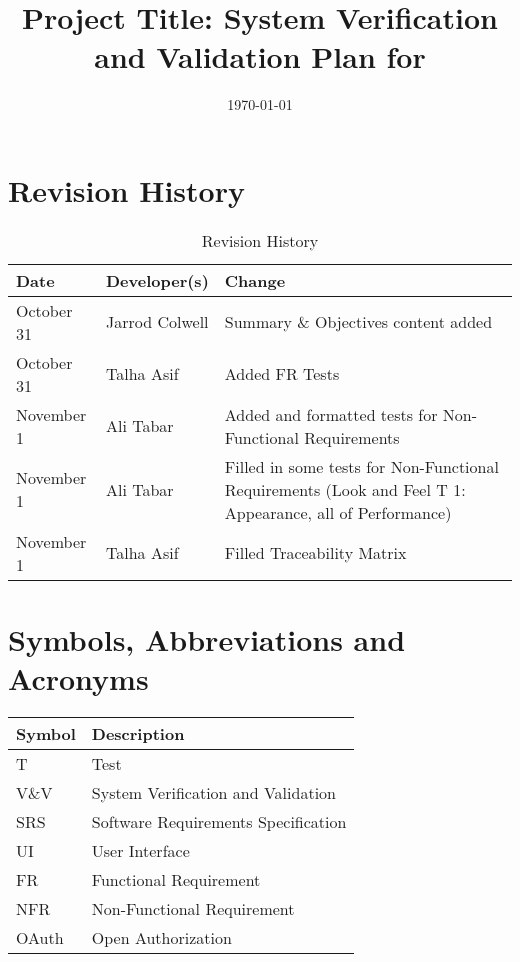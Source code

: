 \documentclass[12pt, titlepage]{article}
\begin{document}
\title{Project Title: System Verification and Validation Plan for \progname{}} 
\author{\authname}
\date{\today}
	
\maketitle


\section*{Revision History}
\begin{table}[hp]
	\caption{Revision History} \label{TblRevisionHistory}
	\begin{tabularx}{\textwidth}{llX}
		\toprule
		\textbf{Date} & \textbf{Developer(s)} & \textbf{Change}\\
		\midrule
		October 31 & Jarrod Colwell & Summary \& Objectives content added\\
		\midrule
		October 31 & Talha Asif & Added FR Tests\\
		\midrule
		November 1 & Ali Tabar & Added and formatted tests for Non-Functional Requirements\\
		\midrule
		November 1 & Ali Tabar & Filled in some tests for Non-Functional Requirements (Look and Feel T 1: Appearance, all of Performance)\\
		\midrule
		November 1 & Talha Asif & Filled Traceability Matrix\\
		\bottomrule
	\end{tabularx}
\end{table}

\newpage

\tableofcontents

\listoftables
{}

\listoffigures
{}

\newpage

\section{Symbols, Abbreviations and Acronyms}

\renewcommand{\arraystretch}{1.2}
\begin{tabular}{l | l} 
  \toprule		
  \textbf{Symbol} & \textbf{Description}\\
  \midrule 
  T & Test\\
  V\&V & System Verification and Validation\\
  SRS & Software Requirements Specification\\
  UI & User Interface\\
  FR & Functional Requirement\\
  NFR & Non-Functional Requirement\\
  OAuth & Open Authorization\\
  \bottomrule
\end{tabular}\\
\end{document}
